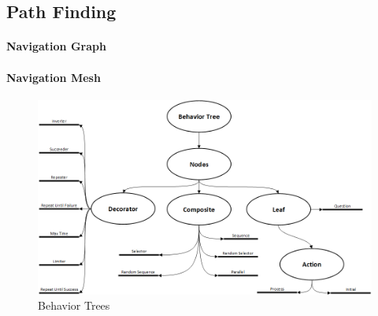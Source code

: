 \subsection{Path Finding}	

\paragraph{Navigation Graph}

\paragraph{Navigation Mesh}
\begin{figure}[h!]
	\centering
	\includegraphics[width=165mm]{Images/behavior_trees}
	\caption{Behavior Trees}
	\label{fig:behavior_trees}
\end{figure}	